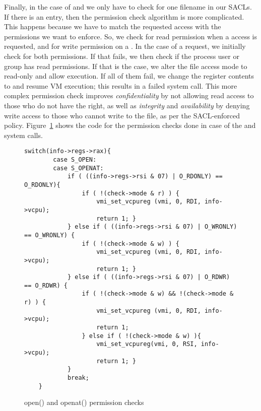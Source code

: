 \par Finally, in the case of  and  we only have to check for one filename in our \ac{SACL}s. If there is an entry, then the permission check algorithm is more complicated. This happens because we have to match the requested access  with the permissions we want to enforce. So, we check for read permission when a  access is requested, and for write permission on a . In the case of a  request, we initially check for both permissions. If that fails, we then check if the process user or group has read permissions. If that is the case, we alter the file access mode to read-only and allow execution. If all of them fail, we change the  register contents to  and resume \ac{VM} execution; this results in a failed system call. This more complex permission check improves \emph{confidentiality} by not allowing read access to those who do not have the right, as well as \emph{integrity} and \emph{availability} by denying write access to those who cannot write to the file, as per the \ac{SACL}-enforced policy. Figure~\ref{fig:open} shows the code for the permission checks done in case of the  and  system calls.




\begin{figure}[ht!]
\selectfont
\begin{lstlisting}[style=CStyle]
	switch(info->regs->rax){
		case S_OPEN:
		case S_OPENAT:
			if ( ((info->regs->rsi & 07) | O_RDONLY) == O_RDONLY){
				if ( !(check->mode & r) ) {
					vmi_set_vcpureg (vmi, 0, RDI, info->vcpu);
					return 1; }
			} else if ( ((info->regs->rsi & 07) | O_WRONLY) == O_WRONLY) {
				if ( !(check->mode & w) ) {
					vmi_set_vcpureg (vmi, 0, RDI, info->vcpu);
					return 1; }
			} else if ( ((info->regs->rsi & 07) | O_RDWR) == O_RDWR) {
				if ( !(check->mode & w) && !(check->mode & r) ) {
					vmi_set_vcpureg (vmi, 0, RDI, info->vcpu);
					return 1;
				} else if ( !(check->mode & w) ){
					vmi_set_vcpureg(vmi, 0, RSI, info->vcpu);
					return 1; }
			}
			break;
	}
\end{lstlisting}
	\caption{open() and openat() permission checks}
	\label{fig:open}
\end{figure}

